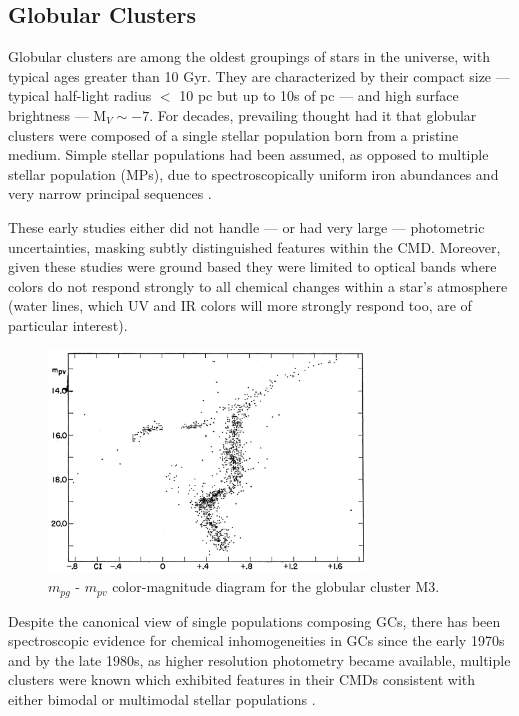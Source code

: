 \subsection{Globular Clusters}\label{sec:intro_GC}
Globular clusters \citep[GC,][]{Herschel1814} are among the oldest groupings of
stars in the universe, with typical ages greater than 10 Gyr. They are
characterized by their compact size --- typical half-light radius $<$ 10 pc but
up to 10s of pc --- and high surface brightness --- M$_{V} \sim -7$. For
decades, prevailing thought had it that globular clusters were composed of a single
stellar population born from a pristine medium. Simple stellar
populations had been assumed, as opposed to multiple stellar population
(MPs), due to spectroscopically uniform iron abundances \citep{Gratton2012} and
very narrow principal sequences \citep[e.g. Figure \ref{fig:M3CMD} taken
from][]{Sandage1953, Stetson1988}.

These early studies either did not handle --- or had very large --- photometric
uncertainties, masking subtly distinguished features within the CMD. Moreover,
given these studies were ground based they were limited to optical bands where
colors do not respond strongly to all chemical changes within a star's
atmosphere (water lines, which UV and IR colors will more strongly
respond too, are of particular interest).

\begin{figure}
	\centering
	\includegraphics[width=0.75\textwidth]{src/Figures/Gould53.png}
	\caption{$m_{pg}$ - $m_{pv}$ color-magnitude diagram for the globular cluster M3.}
	\label{fig:M3CMD}
\end{figure}

Despite the canonical view of single populations composing GCs, there has been
spectroscopic evidence for chemical inhomogeneities in GCs since the early
1970s \citep[e.g.][]{Osborn1971} and by the late 1980s, as higher resolution
photometry became available, multiple clusters were known which exhibited
features in their CMDs consistent with either bimodal or multimodal stellar
populations \citep[e.g.][]{Norris1987}.

